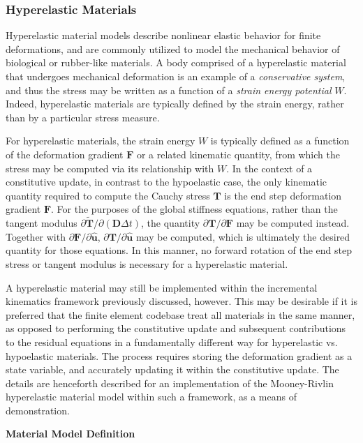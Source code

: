 \subsubsection{Hyperelastic Materials}

Hyperelastic material models describe nonlinear elastic behavior for finite deformations, and are commonly utilized to model the mechanical behavior of biological or rubber-like materials. A body comprised of a hyperelastic material that undergoes mechanical deformation is an example of a  \textit{conservative system}, and thus the stress may be written as a function of a \textit{strain energy potential} $W$. Indeed, hyperelastic materials are typically defined by the strain energy, rather than by a particular stress measure.

For hyperelastic materials, the strain energy $W$ is typically defined as a function of the deformation gradient $\bm{F}$ or a related kinematic quantity, from which the stress may be computed via its relationship with $W$. In the context of a constitutive update, in contrast to the hypoelastic case, the only kinematic quantity required to compute the Cauchy stress $\bm{T}$ is the end step deformation gradient $\bm{F}$. For the purposes of the global stiffness equations, rather than the tangent modulus ${\partial \tilde{\bm{T}}}/{\partial (\bm{D}\Delta{t})}$, the quantity ${\partial \bm{T}}/{\partial \bm{F}}$ may be computed instead. Together with $\partial \bm{F}/\partial \hat{\bm{u}}$, $\partial \bm{T}/\partial \hat{\bm{u}}$ may be computed, which is ultimately the desired quantity for those equations. In this manner, no forward rotation of the end step stress or tangent modulus is necessary for a hyperelastic material.

A hyperelastic material may still be implemented within the incremental kinematics framework previously discussed, however. This may be desirable if it is preferred that the finite element codebase treat all materials in the same manner, as opposed to performing the constitutive update and subsequent contributions to the residual equations in a fundamentally different way for hyperelastic vs. hypoelastic materials. The process requires storing the deformation gradient as a state variable, and accurately updating it within the constitutive update. The details are henceforth described for an implementation of the Mooney-Rivlin hyperelastic material model within such a framework, as a means of demonstration.

\textbf{Material Model Definition}


